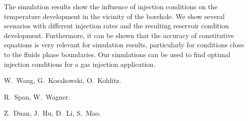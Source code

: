 The simulation results show the influence of injection conditions on the temperature development in the vicinity of the borehole. We show several scenarios with different injection rates and the resulting reservoir condition development. Furthermore, it can be shown that the accuracy of constitutive equations is very relevant for simulation results, particularly for conditions close to the fluids phase boundaries. Our simulations can be used to find optimal injection conditions for a gas injection application.


\begin{thebibliography}{10}

{\sc W.~Wang, G.~Kosakowski, O.~Kolditz}. 

{\sc R.~Span, W.~Wagner}. 

{\sc Z.~Duan, J.~Hu, D.~Li, S.~Mao}. 

\end{thebibliography}